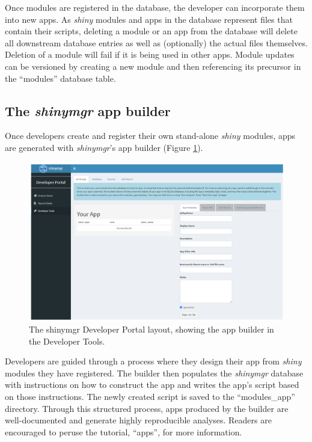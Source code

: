Once modules are registered in the database, the developer can incorporate them into new apps. As \emph{shiny} modules and apps in the database represent files that contain their scripts, deleting a module or an app from the database will delete all downstream database entries as well as (optionally) the actual files themselves. Deletion of a module will fail if it is being used in other apps. Module updates can be versioned by creating a new module and then referencing its precursor in the ``modules'' database table.

\subsection{\texorpdfstring{The \emph{shinymgr} app builder}{The shinymgr app builder}}\label{the-shinymgr-app-builder}

Once developers create and register their own stand-alone \emph{shiny} modules, apps are generated with \emph{shinymgr}'s app builder (Figure \ref{fig:fig5}).

\begin{figure}[h]
\includegraphics[width=1\linewidth]{images/figure5} \caption{The shinymgr Developer Portal layout, showing the app builder in the Developer Tools.}\label{fig:fig5}
\end{figure}

Developers are guided through a process where they design their app from \emph{shiny} modules they have registered. The builder then populates the \emph{shinymgr} database with instructions on how to construct the app and writes the app's script based on those instructions. The newly created script is saved to the ``modules\_app'' directory. Through this structured process, apps produced by the builder are well-documented and generate highly reproducible analyses. Readers are encouraged to peruse the tutorial, ``apps'', for more information.

